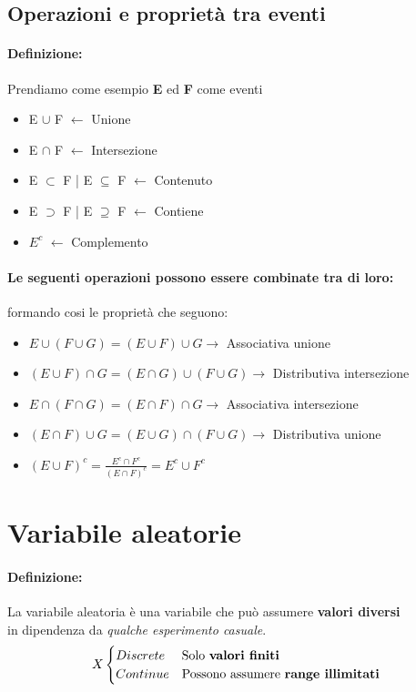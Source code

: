 \documentclass[]{article}
\newcommand{\definizione}{\paragraph{Definizione:}}
\begin{document}
    \subsection{Operazioni e proprietà tra eventi}
    \definizione Prendiamo come esempio \textbf{E} ed \textbf{F} come eventi
    \begin{itemize}
        \item E $\cup$ F $\longleftarrow$ Unione
        \item E $\cap$ F $\longleftarrow$ Intersezione
        \item E $\subset$ F | E $ \subseteq $ F $\longleftarrow$ Contenuto 
        \item E $\supset $ F | E $ \supseteq $ F $\longleftarrow$ Contiene
        \item $E^c$ $\longleftarrow$ Complemento
    \end{itemize}
    \paragraph{Le seguenti operazioni possono essere combinate tra di loro:} formando cosi le proprietà che seguono:
    \begin{itemize}
        \item $ E \cup (F \cup G) = (E \cup F) \cup G \longrightarrow$ Associativa unione
        \item $ (E \cup F) \cap G = (E \cap G) \cup (F \cup G) \longrightarrow$ Distributiva intersezione
        \item $ E \cap (F \cap G) = (E \cap F) \cap G \longrightarrow$ Associativa intersezione
        \item $ (E \cap F) \cup G = (E \cup G) \cap (F \cup G) \longrightarrow$ Distributiva unione
        \item $ (E \cup F)^c = \frac{E^c \cap F^c}{(E \cap F)^c} = E^c \cup F^c $
    \end{itemize}

    \section{Variabile aleatorie}
    \definizione La variabile aleatoria è una variabile che può assumere \textbf{valori diversi} \\ 
    in dipendenza da \textit{qualche esperimento casuale}.
    \[
        X
        \begin{cases}
            Discrete & \text{Solo \textbf{valori finiti}} \\
            Continue & \text{Possono assumere \textbf{range illimitati}}
        \end{cases}
    \]
\end{document}
